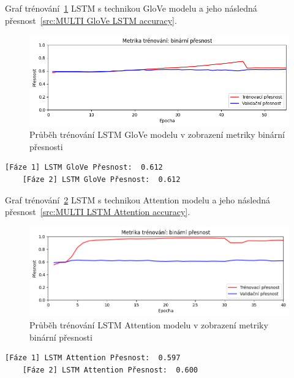 Graf trénování~\ref{fig:MULTI LSTM GloVe model train} LSTM s technikou GloVe modelu a jeho následná přesnost~\ref{src:MULTI GloVe LSTM accuracy}.
\begin{figure}[H]
	\centering
	\includegraphics[width=1\textwidth]{Figures/MULTI_LSTM_GLOVE_binarni_presnost.png}
	\caption{Průběh trénování LSTM GloVe modelu v zobrazení metriky binární přesnosti}\label{fig:MULTI LSTM GloVe model train}
\end{figure}
\begin{lstlisting}[label=src:MULTI GloVe LSTM accuracy, caption={Výsledek GloVe LSTM modelu na více jazyčném datasetu po trénování~\ref{fig:MULTI LSTM GloVe model train}}]
	[Fáze 1] LSTM GloVe Přesnost:  0.612
	[Fáze 2] LSTM GloVe Přesnost:  0.612
\end{lstlisting}

Graf trénování~\ref{fig:MULTI LSTM Attention model train} LSTM s technikou Attention modelu a jeho následná přesnost~\ref{src:MULTI LSTM Attention accuracy}.
\begin{figure}[H]
	\centering
	\includegraphics[width=1\textwidth]{Figures/MULTI_LSTM_Attention_binarni_presnost.png}
	\caption{Průběh trénování LSTM Attention modelu v zobrazení metriky binární přesnosti}\label{fig:MULTI LSTM Attention model train}
\end{figure}
\begin{lstlisting}[label=src:MULTI LSTM Attention accuracy, caption={Výsledek LSTM Attention modelu na více jazyčném datasetu po trénování~\ref{fig:MULTI LSTM Attention model train}}]
	[Fáze 1] LSTM Attention Přesnost:  0.597
	[Fáze 2] LSTM Attention Přesnost:  0.600
\end{lstlisting}

